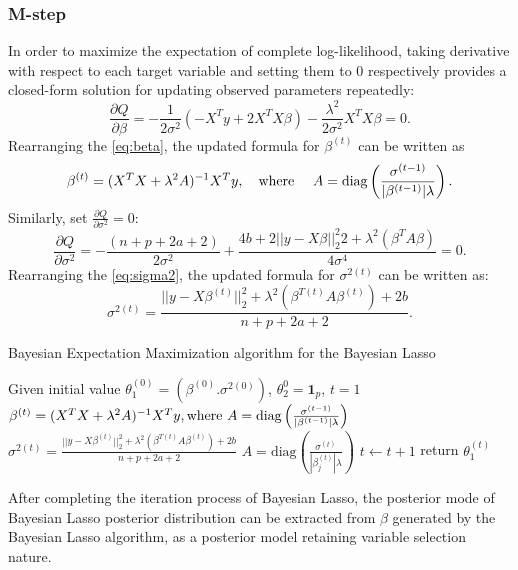 \subsubsection{M-step}
In order to maximize the expectation of complete log-likelihood, taking derivative with respect to each target variable and setting them to 0 respectively provides a closed-form solution for updating observed parameters repeatedly:
\begin{equation}
	\label{eq:beta}
	\frac{\partial Q}{\partial \beta} = -\frac{1}{2\sigma^2}(-X^Ty+2X^TX\beta)-\frac{\lambda^2}{2\sigma^2}X^TX\beta = 0.
\end{equation}
Rearranging the \autoref{eq:beta}, the updated formula for $\beta^{(t)}$ can be written as
\begin{equation}
	\beta^{(t)} = (X^TX + \lambda^2 A)^{-1}X^Ty, \quad \text{where } \quad A = \textnormal{diag}\left(\frac{\sigma^{(t-1)}}{|\beta^{(t-1)}|\lambda}\right).
\end{equation}
Similarly, set $\frac{\partial Q}{\partial \sigma^2} = 0$:
\begin{equation}
	\label{eq:sigma2}
	\frac{\partial Q}{\partial \sigma^2} = -\frac{(n+p+2a+2)}{2\sigma^2} + \frac{4b + 2||y-X\beta||_2^2{2} + \lambda^2(\beta^TA\beta)}{4\sigma^4} = 0.
\end{equation}
Rearranging the \autoref{eq:sigma2}, the updated formula for $\sigma^{2(t)}$ can be written as:
\begin{equation}
	\sigma^{2(t)} = \frac{||y-X\beta^{(t)}||_2^2 + \lambda^2 (\beta^{T(t)}A\beta^{(t)}) + 2b}{n+p+2a+2}.
\end{equation}
\begin{algorithm}
	\caption{Bayesian Expectation Maximization algorithm for the Bayesian Lasso}
	\begin{algorithmic}[1]
		\State Given initial value $\theta_1^{(0)} =(\beta^{(0)}.\sigma^{2(0)})$, $\theta_2^0 = \mathbf{1}_p$, $t=1$
		\State $\beta^{(t)} = (X^TX + \lambda^2 A)^{-1}X^Ty,\text{where } A = \textnormal{diag}\left(\frac{\sigma^{(t-1)}}{|\beta^{(t-1)}|\lambda}\right)$ 
		\State 	$\sigma^{2(t)} = \frac{||y-X\beta^{(t)}||_2^2 + \lambda^2 (\beta^{T(t)}A\beta^{(t)}) + 2b}{n+p+2a+2}$ 
		\State $A = \text{diag}\left( \frac{\sigma^{(t)}}{|\beta_j^{(t)}|\lambda}\right)$
		\State $t \leftarrow t + 1$
		\EndWhile  
		\State	return $\theta_1^{(t)}$	
	\end{algorithmic}
\end{algorithm}
\noindent After completing the iteration process of Bayesian Lasso, the posterior mode of Bayesian Lasso posterior distribution can be extracted from $\beta$ generated by the Bayesian Lasso algorithm, as a posterior model retaining variable selection nature.
